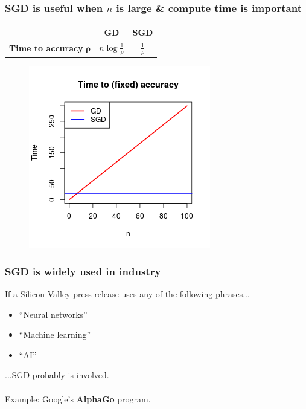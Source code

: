 \documentclass{beamer}
\begin{document}
\begin{frame}
	\frametitle{SGD is useful when $n$ is large \& compute
	time is important}
	\begin{table}[t]
		\begin{tabular}{|l|c|c|}
			\hline
			& \textbf{GD} & \textbf{SGD} \\
			\textbf{Time to accuracy} $\mathbf{\rho}$ & $n \log
			\frac{1}{\rho}$ & $\frac{1}{\rho}$ \\
			\hline
		\end{tabular}
	\end{table}

	\begin{figure}
	\centering
	\includegraphics[scale=0.55]{comparison}
	\end{figure}

			
\end{frame}

\begin{frame}
	\frametitle{SGD is widely used in industry}
	If a Silicon Valley press release uses any of the following phrases...
	\begin{itemize}
		\item \small ``Neural networks''
		\item ``Machine learning''
		\item ``AI'' 
	\end{itemize}

	...SGD probably is involved. \\~\\
	
	Example: Google's \textbf{AlphaGo} program.
\end{frame}
\end{document}
